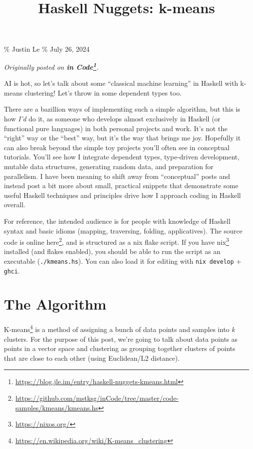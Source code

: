\documentclass[]{article}
\title{Haskell Nuggets: k-means}
\renewcommand{\href}[2]{#2\footnote{\url{#1}}}
\begin{document}
\maketitle

\% Justin Le \% July 26, 2024

\emph{Originally posted on
\textbf{\href{https://blog.jle.im/entry/haskell-nuggets-kmeans.html}{in Code}}.}

AI is hot, so let's talk about some ``classical machine learning'' in Haskell
with k-means clustering! Let's throw in some dependent types too.

There are a bazillion ways of implementing such a simple algorithm, but this is
how \emph{I'd} do it, as someone who develops almost exclusively in Haskell (or
functional pure languages) in both personal projects and work. It's not the
``right'' way or the ``best'' way, but it's the way that brings me joy.
Hopefully it can also break beyond the simple toy projects you'll often see in
conceptual tutorials. You'll see how I integrate dependent types, type-driven
development, mutable data structures, generating random data, and preparation
for parallelism. I have been meaning to shift away from ``conceptual'' posts and
instead post a bit more about small, practical snippets that demonstrate some
useful Haskell techniques and principles drive how I approach coding in Haskell
overall.

For reference, the intended audience is for people with knowledge of Haskell
syntax and basic idioms (mapping, traversing, folding, applicatives). The source
code
\href{https://github.com/mstksg/inCode/tree/master/code-samples/kmeans/kmeans.hs}{is
online here}, and is structured as a nix flake script. If you have
\href{https://nixos.org/}{nix} installed (and flakes enabled), you should be
able to run the script as an executable (\texttt{./kmeans.hs}). You can also
load it for editing with \texttt{nix\ develop} + \texttt{ghci}.

\section{The Algorithm}\label{the-algorithm}

\href{https://en.wikipedia.org/wiki/K-means_clustering}{K-means} is a method of
assigning a bunch of data points and samples into \emph{k} clusters. For the
purpose of this post, we're going to talk about data points as points in a
vector space and clustering as grouping together clusters of points that are
close to each other (using Euclidean/L2 distance).
\end{document}

